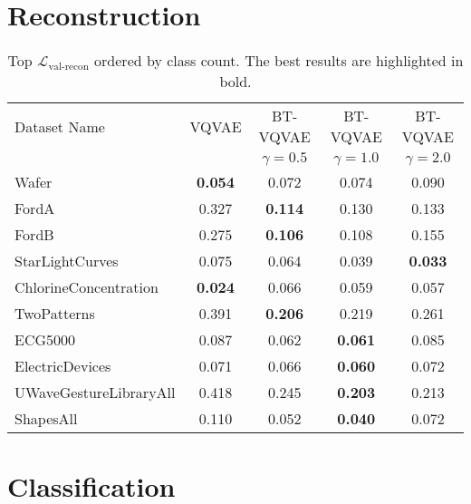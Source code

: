 \documentclass[../../thesis.tex]{subfiles}
\begin{document}
\section{Reconstruction}


\begin{table}
    \centering
    \begin{tabular}{l c c c c}
    \toprule
    Dataset Name & VQVAE & BT-VQVAE & BT-VQVAE & BT-VQVAE \\
    & & $\gamma = 0.5$ & $\gamma = 1.0$ & $\gamma = 2.0$ \\
    \midrule
    Wafer & \textbf{0.054} & 0.072 & 0.074 & 0.090 \\
    FordA & 0.327 & \textbf{0.114} & 0.130 & 0.133 \\
    FordB & 0.275 & \textbf{0.106} & 0.108 & 0.155 \\
    StarLightCurves & 0.075 & 0.064 & 0.039 & \textbf{0.033} \\
    ChlorineConcentration & \textbf{0.024} & 0.066 & 0.059 & 0.057 \\
    TwoPatterns & 0.391 & \textbf{0.206} & 0.219 & 0.261 \\
    ECG5000 & 0.087 & 0.062 & \textbf{0.061} & 0.085 \\
    ElectricDevices & 0.071 & 0.066 & \textbf{0.060} & 0.072 \\
    UWaveGestureLibraryAll & 0.418 & 0.245 & \textbf{0.203} & 0.213 \\
    ShapesAll & 0.110 & 0.052 & \textbf{0.040} & 0.072 \\
    \bottomrule
    \end{tabular}
    \caption{Top $\mathcal{L}_\text{val-recon}$ ordered by class count. The best results are highlighted in bold.}
    \label{tab:recon_loss}
\end{table}

\section{Classification}
\end{document}
